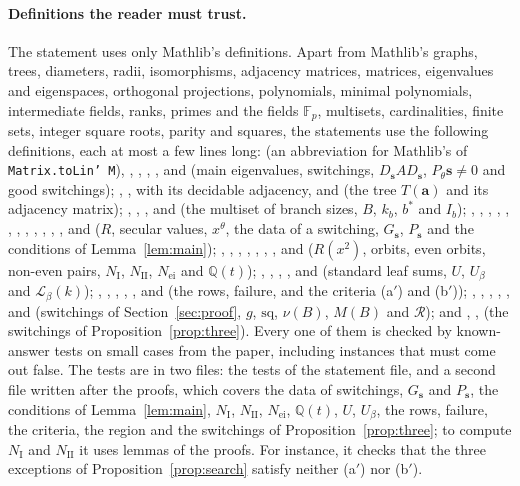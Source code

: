 \documentclass[11pt]{article}
\numberwithin{equation}{section}
\theoremstyle{remark}
\newcommand{\Q}{\mathbb Q}
\newcommand{\F}{\mathbb F}
\newcommand{\s}{\mathbf s}
\newcommand{\cL}{\mathcal L}
\newcommand{\cR}{\mathcal R}
\newcommand{\bfa}{\mathbf a}
\newcommand{\NI}{N_{\mathrm I}}
\newcommand{\NII}{N_{\mathrm{II}}}
\newcommand{\Nei}{N_{\mathrm{ei}}}
\newcommand{\sq}{\mathrm{sq}}
\begin{document}
\paragraph{Definitions the reader must trust.}
The statement  uses only Mathlib's definitions. Apart from Mathlib's graphs, trees, diameters, radii, isomorphisms, adjacency
matrices, matrices, eigenvalues and eigenspaces, orthogonal projections,
polynomials, minimal polynomials, intermediate fields, ranks, primes and the
fields $\F_p$, multisets, cardinalities, finite sets, integer square roots,
parity and squares, the statements use the following definitions, each at
most a few lines long:  (an abbreviation for Mathlib's
 of \texttt{Matrix.toLin' M}), ,
,
, ,  and  (main
eigenvalues, switchings, $D_{\s}AD_{\s}$, $P_\theta\s\ne0$ and good
switchings); , ,  with its decidable
adjacency, and  (the tree $T(\bfa)$ and its adjacency matrix);
, , ,  and  (the
multiset of branch sizes, $B$, $k_b$, $b^*$ and $I_b$); ,
, , , , , ,
, , , , ,  and
 ($R$, secular values, $x^\theta$, the data of a switching,
$G_{\s}$, $P_{\s}$ and the conditions of Lemma~\ref{lem:main});
, , , ,
, , ,  and 
($R(x^2)$, orbits, even orbits, non-even pairs, $\NI$, $\NII$, $\Nei$ and
$\Q(t)$); , , , ,
 and  (standard leaf sums, $U$, $U_\beta$ and
$\cL_\beta(k)$); , ,
, , ,  and
 (the rows, failure, and the criteria (a$'$) and (b$'$));
, , , , ,
 and  (switchings of Section~\ref{sec:proof}, $g$,
$\sq$, $\nu(B)$, $M(B)$ and $\cR$); and , ,
 (the switchings of Proposition~\ref{prop:three}). Every one of
them is checked by known-answer tests on small cases from the paper, including
instances that must come out false. The tests are in two files: the tests of
the statement file, and a second file written after the proofs, which covers
the data of switchings, $G_{\s}$ and $P_{\s}$, the conditions of
Lemma~\ref{lem:main}, $\NI$, $\NII$, $\Nei$, $\Q(t)$, $U$, $U_\beta$, the rows,
failure, the criteria, the region and the switchings of
Proposition~\ref{prop:three}; to compute $\NI$ and $\NII$ it uses lemmas of the
proofs. For instance, it checks that the three exceptions of
Proposition~\ref{prop:search} satisfy neither (a$'$) nor (b$'$).
\end{document}
